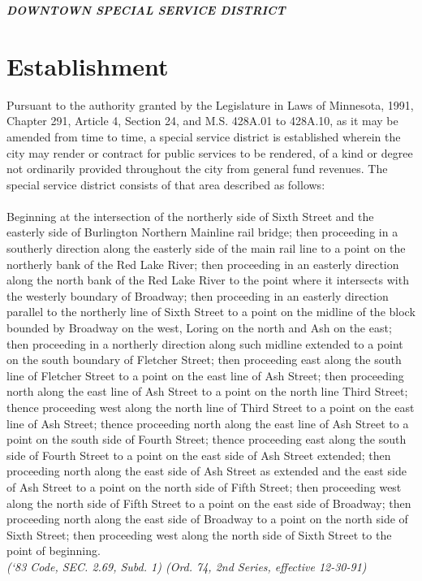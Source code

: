 \begin{center}
    \textbf{\emph{\LARGE{DOWNTOWN SPECIAL SERVICE DISTRICT}}}
\end{center}

\setcounter{section}{14}
\section{Establishment}
Pursuant to the authority granted by the Legislature in Laws of Minnesota, 1991, Chapter 291, Article 4, Section 24, and M.S. \textsection 428A.01 to \textsection 428A.10, as it may be amended from time to time, a special service district is established wherein the city may render or contract for public services to be rendered, of a kind or degree not ordinarily provided throughout the city from general fund revenues. The special service district consists of that area described as follows:\\
\\
Beginning at the intersection of the northerly side of Sixth Street and the easterly side of Burlington Northern Mainline rail bridge; then proceeding in a southerly direction along the easterly side of the main rail line to a point on the northerly bank of the Red Lake River; then proceeding in an easterly direction along the north bank of the Red Lake River to the point where it intersects with the westerly boundary of Broadway; then proceeding in an easterly direction parallel to the northerly line of Sixth Street to a point on the midline of the block bounded by Broadway on the west, Loring on the north and Ash on the east; then proceeding in a northerly direction along such midline extended to a point on the south boundary of Fletcher Street; then proceeding east along the south line of Fletcher Street to a point on the east line of Ash Street; then proceeding north along the east line of Ash Street to a point on the north line Third Street; thence proceeding west along the north line of Third Street to a point on the east line of Ash Street; thence proceeding north along the east line of Ash Street to a point on the south side of Fourth Street; thence proceeding east along the south side of Fourth Street to a point on the east side of Ash Street extended; then proceeding north along the east side of Ash Street as extended and the east side of Ash Street to a point on the north side of Fifth Street; then proceeding west along the north side of Fifth Street to a point on the east side of Broadway; then proceeding north along the east side of Broadway to a point on the north side of Sixth Street; then proceeding west along the north side of Sixth Street to the point of beginning.\\
\emph{(‘83 Code, SEC. 2.69, Subd. 1) (Ord. 74, 2nd Series, effective 12-30-91)}

